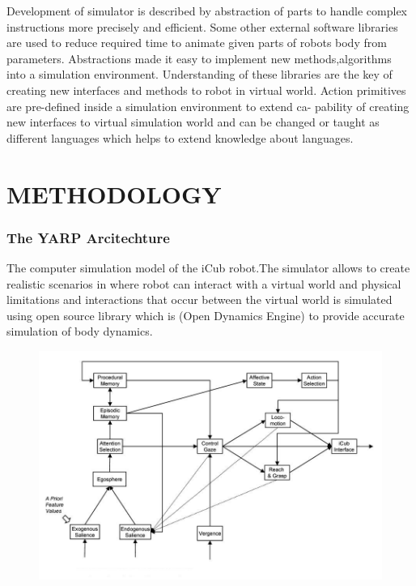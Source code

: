 \documentclass[a4paper, 12pt]{report}
\begin{document}
  Development of simulator is described by abstraction of parts to handle 
  complex 
  instructions more precisely and efficient. Some other external software 
  libraries are used to reduce required time to animate given parts of robots 
  body from parameters. Abstractions made it easy to implement new 
  methods,algorithms into a simulation environment. Understanding of these 
  libraries are the key of creating new interfaces and methods to robot in 
  virtual world.
  Action primitives are pre-defined inside a simulation environment to extend 
  ca- 
  pability of creating new interfaces to virtual simulation world and can be 
  changed or taught as different languages which helps to extend knowledge 
  about 
  languages.
  
  \chapter{METHODOLOGY}
  
  \subsection{The YARP Arcitechture}
  The computer simulation model of the iCub robot.The simulator allows to 
  create realistic scenarios in where robot can interact with a virtual world 
  and 
  physical limitations and interactions that occur between the virtual world is 
  simulated using open source library which is \cite{ODE} (Open Dynamics 
  Engine) 
  to 
  provide accurate simulation of body dynamics.
  
  \begin{figure}[h!]
    \centering
    \includegraphics[width=1.0\linewidth]{cognitive_architecture}
    \caption{}
    \label{fig:cognitive_architecture}
  \end{figure}
  
\end{document}

